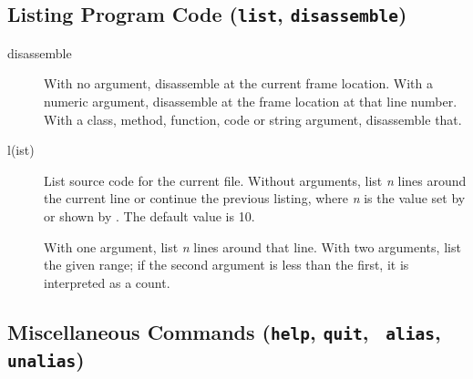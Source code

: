 \subsection{Listing Program Code ({\tt list}, {\tt disassemble})\label{subsection-listing}}

\begin{description}

\item[disassemble ]

With no argument, disassemble at the current frame location.  With a
numeric argument, disassemble at the frame location at that line
number. With a class, method, function, code or string argument,
disassemble that.

\item[l(ist) ]\label{command:list}

List source code for the current file.  Without arguments, list
\emph{n} lines around the current line or continue the previous
listing, where \emph{n} is the value set by  or
shown by .  The default value is 10.

With one argument, list \emph{n} lines around that line.  With
two arguments, list the given range; if the second argument is less
than the first, it is interpreted as a count.

\end{description}

\subsection{Miscellaneous Commands ({\tt help}, {\tt quit}, {\tt
    alias}, {\tt unalias})\label{subsection-misc}}


